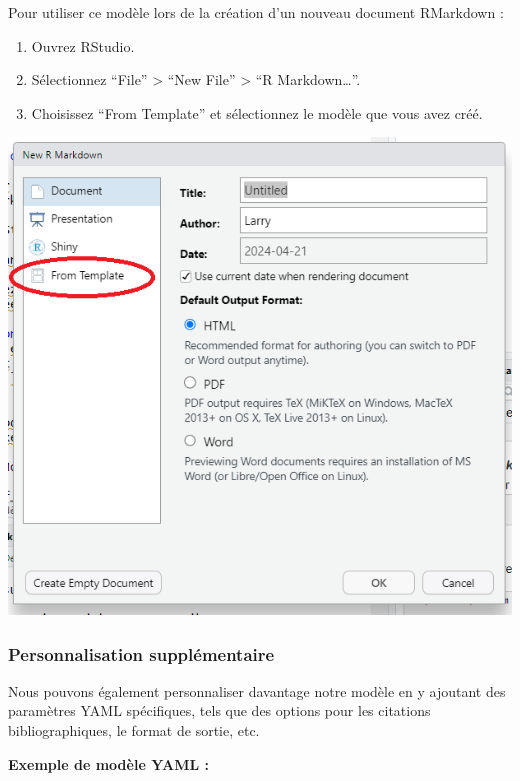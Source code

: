 \documentclass[
  12pt,
]{article}
\begin{document}
Pour utiliser ce modèle lors de la création d'un nouveau document
RMarkdown :

\begin{enumerate}
\def\labelenumi{\arabic{enumi}.}
\item
  Ouvrez RStudio.
\item
  Sélectionnez ``File'' \textgreater{} ``New File'' \textgreater{} ``R
  Markdown\ldots{}''.
\item
  Choisissez ``From Template'' et sélectionnez le modèle que vous avez
  créé.
\end{enumerate}

\begin{center}\includegraphics[width=1\linewidth,height=1\textheight]{../Document_Rmarkdown/Images/From_template} \end{center}

\subsubsection{Personnalisation
supplémentaire}\label{personnalisation-suppluxe9mentaire}

Nous pouvons également personnaliser davantage notre modèle en y
ajoutant des paramètres YAML spécifiques, tels que des options pour les
citations bibliographiques, le format de sortie, etc.

\textbf{Exemple de modèle YAML :}
\end{document}

